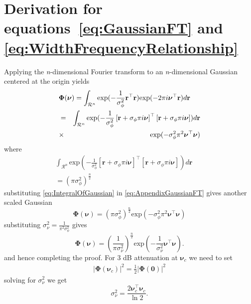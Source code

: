 \documentclass[10pt,a4paper]{article}
\begin{document}
\section{Derivation for equations~\ref{eq:GaussianFT} and \ref{eq:WidthFrequencyRelationship} }\label{ap:FrequencyAnalysis}
Applying the \textit{n}-dimensional Fourier transform \cite{Arsac1966} to an \textit{n}-dimensional Gaussian centered at the origin yields
\begin{eqnarray}\label{eq:AppendixGaussianFT}
 \lefteqn{\boldsymbol\Phi(\boldsymbol \nu)=\int_{\mathcal R^n}\mathrm{exp}({-\frac{1}{\sigma_{\phi}^2}\mathbf r^\top\mathbf r})\mathrm{exp}(-2\pi i\boldsymbol\nu^\top\mathbf r)d\mathbf r} \nonumber \\
&=&\int_{\mathcal R^n}\mathrm{exp}(-\frac{1}{\sigma_{\phi}^2}\left[\mathbf r +\sigma_{\phi}\pi i \boldsymbol\nu\right]^\top\left[\mathbf r +\sigma_{\phi}\pi i \boldsymbol\nu\right])d\mathbf r \nonumber \\
&\times& \mathrm{exp}(-\sigma_{\phi}^2\pi^2\boldsymbol\nu^\top \boldsymbol\nu)
\end{eqnarray}
where 
\begin{eqnarray}\label{eq:IntegralOfGaussian}
\int_{\mathcal R^n}\mathrm{exp}(-\frac{1}{\sigma_{\phi}^2}\left[\mathbf r +\sigma_{\phi}\pi i \boldsymbol\nu\right]^\top\left[\mathbf r +\sigma_{\phi}\pi i \boldsymbol\nu\right])d\mathbf r&& \nonumber \\
=(\pi\sigma_{\phi}^2)^{\frac{n}{2}}&&
\end{eqnarray}
substituting \ref{eq:IntegralOfGaussian} in \ref{eq:AppendixGaussianFT} gives another scaled  Gaussian 
\begin{equation}
   \boldsymbol\Phi(\boldsymbol\nu)=(\pi\sigma_{\phi}^2)^{\frac{n}{2}}\mathrm{exp}(-\sigma_{\phi}^2\pi^2\boldsymbol\nu^\top \boldsymbol\nu)
\end{equation}
substituting $\sigma_{\nu}^2=\frac{1}{\pi^2\sigma_{\phi}^2}$ gives 
\begin{equation}
\boldsymbol\Phi(\boldsymbol \nu)=(\frac{1}{\pi\sigma_{\nu}^2})^{\frac{n}{2}}\mathrm{exp}(-\frac{1}{\sigma_{\nu}^2}\boldsymbol\nu^\top \boldsymbol\nu).
\end{equation}
and hence completing the proof. For 3 dB attenuation at $\boldsymbol\nu_c$ we need to set
\begin{eqnarray}
 |\boldsymbol\Phi(\boldsymbol\nu_{c})|^2=\frac{1}{2}|\boldsymbol\Phi(\mathbf 0)|^2
\end{eqnarray}
solving for $\sigma_{\nu}^2$ we get
\begin{equation}
 \sigma_{\nu}^2=\frac{2\boldsymbol\nu_{c}^\top \boldsymbol\nu_{c}}{\ln 2 }.
\end{equation}
\end{document}
